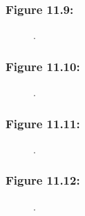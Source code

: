 \documentclass[t]{beamer}\usepackage[]{graphicx}\usepackage[]{color}
\begin{document}
\begin{frame}[label=Figure_11_9]
\frametitle{Figure 11.9: }
\begin{figure}[t]
\begin{minipage}[b]{\textwidth}
\centering

\caption{.}
\end{minipage}
\end{figure}
\end{frame}


\begin{frame}[label=Figure_11_10]
\frametitle{Figure 11.10: }
\begin{figure}[t]
\begin{minipage}[b]{\textwidth}
\centering

\caption{.}
\end{minipage}
\end{figure}
\end{frame}


\begin{frame}[label=Figure_11_11]
\frametitle{Figure 11.11: }
\begin{figure}[t]
\begin{minipage}[b]{\textwidth}
\centering

\caption{.}
\end{minipage}
\end{figure}
\end{frame}


\begin{frame}[label=Figure_11_12]
\frametitle{Figure 11.12: }
\begin{figure}[t]
\begin{minipage}[b]{\textwidth}
\centering

\caption{.}
\end{minipage}
\end{figure}
\end{frame}
\end{document}
